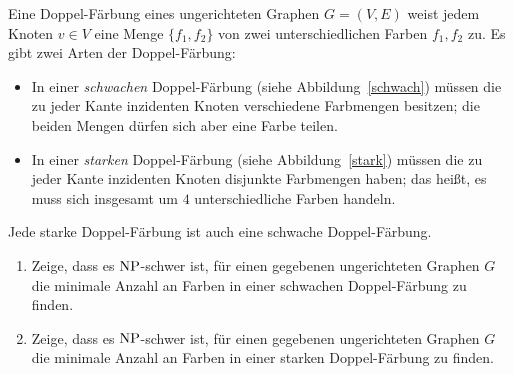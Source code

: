 \documentclass{uebung_cs}
\begin{document}
\begin{exercise}[Doppel-Färbung]
	Eine Doppel-Färbung eines ungerichteten Graphen $G = (V,E)$ weist jedem Knoten $v \in V$ eine Menge $\{f_1,f_2\}$ von zwei unterschiedlichen Farben $f_1,f_2$ zu. Es gibt zwei Arten der Doppel-Färbung:
	\begin{itemize}
		\item In einer \textit{schwachen} Doppel-Färbung (siehe Abbildung~\ref{schwach}) müssen die zu jeder Kante inzidenten Knoten verschiedene Farbmengen besitzen; die beiden Mengen dürfen sich aber eine Farbe teilen.
		\item In einer \textit{starken} Doppel-Färbung (siehe Abbildung~\ref{stark}) müssen die zu jeder Kante inzidenten Knoten disjunkte Farbmengen haben; das heißt, es muss sich insgesamt um $4$ unterschiedliche Farben handeln.
	\end{itemize}
	Jede starke Doppel-Färbung ist auch eine schwache Doppel-Färbung.
	\begin{enumerate}
		\item\medium Zeige, dass es $\mathrm{NP}$-schwer ist, für einen gegebenen ungerichteten Graphen $G$ die minimale Anzahl an Farben in einer schwachen Doppel-Färbung zu finden.
		\item\hard Zeige, dass es $\mathrm{NP}$-schwer ist, für einen gegebenen ungerichteten Graphen $G$ die minimale Anzahl an Farben in einer starken Doppel-Färbung zu finden.
	\end{enumerate}
	\begin{figure}[ht]
	    \begin{minipage}{0.5\linewidth}
	        \centering
\end{minipage}
\end{figure}
\end{exercise}
\end{document}
